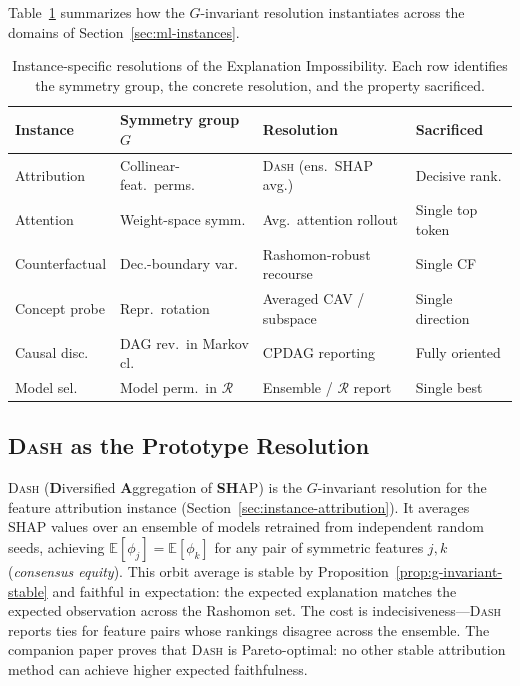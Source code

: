 \documentclass[11pt,a4paper]{article}
\newcommand{\E}{\mathbb{E}}
\newcommand{\DASH}{\textsc{Dash}}
\begin{document}
Table~\ref{tab:resolutions} summarizes how the $G$-invariant resolution
instantiates across the domains of Section~\ref{sec:ml-instances}.

\begin{table}[t]
\centering
\caption{Instance-specific resolutions of the Explanation
  Impossibility.  Each row identifies the symmetry group, the concrete
  resolution, and the property sacrificed.}
\label{tab:resolutions}
\small
\setlength{\tabcolsep}{4pt}
\begin{tabular}{@{}llll@{}}
\toprule
Instance & Symmetry group $G$ & Resolution & Sacrificed \\
\midrule
Attribution & Collinear-feat.\ perms. & \DASH{} (ens.\ SHAP avg.) & Decisive rank. \\
Attention & Weight-space symm. & Avg.\ attention rollout & Single top token \\
Counterfactual & Dec.-boundary var. & Rashomon-robust recourse & Single CF \\
Concept probe & Repr.\ rotation & Averaged CAV / subspace & Single direction \\
Causal disc. & DAG rev.\ in Markov cl. & CPDAG reporting & Fully oriented \\
Model sel. & Model perm.\ in $\mathcal{R}$ & Ensemble / $\mathcal{R}$ report & Single best \\
\bottomrule
\end{tabular}
\end{table}

\subsection{\DASH{} as the Prototype Resolution}
\label{sec:dash-prototype}

\DASH{} (\textbf{D}iversified \textbf{A}ggregation of \textbf{SH}AP)
is the $G$-invariant resolution for the feature attribution instance
(Section~\ref{sec:instance-attribution}).  It averages SHAP values over an
ensemble of models retrained from independent random seeds, achieving
$\E[\phi_j] = \E[\phi_k]$ for any pair of symmetric features $j, k$
(\emph{consensus equity}).  This orbit average is stable by
Proposition~\ref{prop:g-invariant-stable} and faithful in expectation: the
expected explanation matches the expected observation across the Rashomon set.
The cost is indecisiveness---\DASH{} reports ties for feature pairs whose
rankings disagree across the ensemble.  The companion paper proves that
\DASH{} is Pareto-optimal: no other stable attribution method can achieve
higher expected faithfulness.
\end{document}
